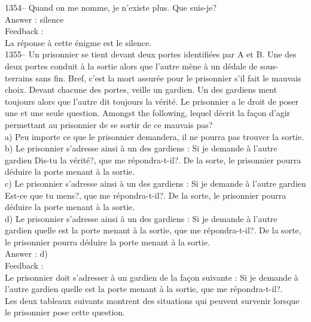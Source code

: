 ﻿\documentclass[letterpaper, 12pt]{article}
\begin{document}
1354-- Quand on me nomme, je n'existe plus.  Que suis-je?\\

Answer : silence\\

Feedback : \\
La r\'eponse \`a cette \'enigme est le silence.\\

1355-- Un prisonnier se tient devant deux portes identifi\'ees par A et B.
Une des deux portes conduit \`a la sortie alors que l'autre m\`ene \`a un
d\'edale de sous-terrains sans fin.  Bref, c'est la mort assur\'ee pour le
prisonnier s'il fait le mauvais choix. Devant chacune des portes, veille un
gardien.  Un des gardiens ment toujours alors que l'autre dit toujours la
v\'erit\'e.  Le prisonnier a le droit de poser une et une seule question.
Amongst the following, lequel d\'ecrit la fa\c con d'agir
permettant au prisonnier de se sortir de ce mauvais pas?\\
a) Peu importe ce que le prisonnier demandera, il ne pourra pas trouver la
sortie.\\
b) Le prisonnier s'adresse ainsi \`a un des gardiens : \og Si je
demande \`a l'autre gardien \og Dis-tu la v\'erit\'e?\fg , que me
r\'epondra-t-il?\fg . De la
sorte, le prisonnier pourra d\'eduire la porte menant \`a la sortie.\\
c) Le prisonnier s'adresse ainsi \`a un des gardiens : \og Si je
demande \`a l'autre gardien \og Est-ce que tu mens?\fg , que me
r\'epondra-t-il?\fg . De la
sorte, le prisonnier pourra d\'eduire la porte menant \`a la sortie.\\
d) Le prisonnier s'adresse ainsi \`a un des gardiens : \og Si je
demande \`a l'autre gardien quelle est la porte menant \`a la
sortie, que me r\'epondra-t-il?\fg . De la sorte, le prisonnier
pourra d\'eduire la porte
menant \`a la sortie.\\

Answer : d)\\

Feedback : \\
Le prisonnier doit s'adresser \`a un gardien de la fa\c con suivante
: \og Si je demande \`a l'autre gardien
quelle est la porte menant \`a la sortie, que me r\'epondra-t-il?\fg .\\
Les deux tableaux suivants montrent des situations qui peuvent survenir
lorsque le prisonnier pose cette question.  \\
\end{document}
